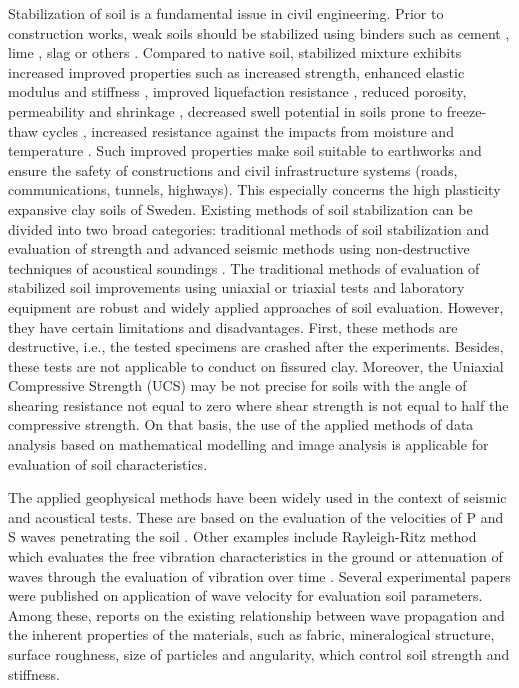 \documentclass[final,3p,times,twocolumn]{elsarticle}
\begin{document}
Stabilization of soil is a fundamental issue in civil engineering. Prior to construction works, weak soils should be stabilized using binders such as cement \cite{Bache,Chenetal2021,LindhLemenkova2022b}, lime \cite{Kichouetal,Chand}, slag \cite{LindhLemenkova2021a} or others \cite{Mirzababaei}. Compared to native soil, stabilized mixture exhibits increased improved properties such as increased strength, enhanced elastic modulus and stiffness \cite{Madhyannapuetal2010,SUNDARY2022103299}, improved liquefaction resistance \cite{ITO199433}, reduced porosity, permeability and shrinkage \cite{TONINIDEARAUJO2023129757,Nagih,Ahnberg2003}, decreased swell potential in soils prone to freeze-thaw cycles \cite{ShihataBaghdadi,BinShafique,Orakoglu}, increased resistance against the impacts from moisture and temperature \cite{Zhangetal2020,Kimetal2012}. Such improved properties make soil suitable to earthworks and ensure the safety of constructions and civil infrastructure systems (roads, communications, tunnels, highways). This especially concerns the high plasticity expansive clay soils of Sweden. Existing methods of soil stabilization can be divided into two broad categories: traditional methods of soil stabilization and evaluation of strength \cite{Trhl,LindhLemenkova2022a,Heidarizadeh} and advanced seismic methods using non-destructive techniques of acoustical soundings \cite{Varma,Foti,LindhLemenkova2021b,GarciaSuarez}. The traditional methods of evaluation of stabilized soil improvements using uniaxial \cite{Avci,Lapointe,XuYi} or triaxial \cite{ALVARADO} tests and laboratory equipment are robust and widely applied approaches of soil evaluation. However, they have certain limitations and disadvantages. First, these methods are destructive, i.e., the tested specimens are crashed after the experiments. Besides, these tests are not applicable to conduct on fissured clay. Moreover, the Uniaxial Compressive Strength (UCS) may be not precise for soils with the angle of shearing resistance not equal to zero where shear strength is not equal to half the compressive strength. On that basis, the use of the applied methods of data analysis based on mathematical modelling \cite{Jefferies} and image analysis \cite{Kallenetal2014,Kallenetal2016} is applicable for evaluation of soil characteristics.

The applied geophysical methods have been widely used in the context of seismic and acoustical tests. These are based on the evaluation of the velocities of P and S waves penetrating the soil \cite{Safaee,LindhLemenkova2022c,FotiLancellotta}. Other examples include Rayleigh-Ritz method which evaluates the free vibration characteristics in the ground \cite{SonkarMittal,Jones} or attenuation of waves through the evaluation of vibration over time \cite{Colombero}. Several experimental papers were published on application of wave velocity for evaluation soil parameters. Among these, \cite{Santamarina} reports on the existing relationship between wave propagation and the inherent properties of the materials, such as fabric, mineralogical structure, surface roughness, size of particles and angularity, which control soil strength and stiffness.
\end{document}
